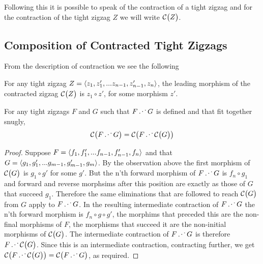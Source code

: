 Following this it is possible to speak of 
the contraction of a tight zigzag
and for the contraction of the tight zigzag $Z$ we will write $\mathcal{C}\bigl(Z\bigr)$.

\subsection{Composition of Contracted Tight Zigzags}

From the description of contraction we see the following
\begin{observation}
\label{observationRegardingTheLeadingMorphimOfContractedTightZigzag}
For any tight zigzag $Z=\langle z_1,z'_1,...z_{n-1},z'_{n-1},z_{n}\rangle$, the leading morphism
of the contracted zigzag $\mathcal{C}\bigl(Z\bigr)$ is $z_1 \circ z'$, for some morphism $z'$. 
\end{observation}

\begin{lemma}
For any tight zigzags $F$ and $G$ such that $F \cnc G$ is defined 
and that fit together snugly,
\[
\contract{F\cnc G} = \contract{F\cnc \contract{G}} 
\]
\end{lemma}
\begin{proof}
Suppose $F=\langle f_1,f'_1,...f_{n-1},f'_{n-1},f_{n}\rangle$ and that $G=\langle g_1,g'_1,...g_{m-1},g'_{m-1},g_{m}\rangle$.
 By the observation above the first morphism of $\mathcal{C}\bigl(G\bigr)$ is 
$g_1 \circ g'$ for some $g'$.  
But the n'th forward morphism of $F \cnc G$ is $f_n \circ g_1$ and forward and reverse morphsims  after this position are exactly as those of $G$ that succeed $g_1$. Therefore the same eliminations that are followed to reach $\mathcal{C}\bigl(G\bigr)$ from $G$ apply to  $F \cnc G$. 
In the resulting intermediate contraction of $F \cnc G$
 the n'th forward morphism is 
$f_n \circ g \circ g'$, the morphims that preceded this
are the non-final morphisms of $F$, the morphisms that succeed
it are the non-initial morphisms of $\mathcal{C}\bigl(G\bigr)$.
The intermediate contraction of $F \cnc G$ is therefore  
 $F \cnc \contract{G}$. Since this is an intermediate contraction, contracting further, we get 
 $\contract{F\cnc \contract{G}} =  \contract{F\cnc G}$, as required.        
\end{proof}

